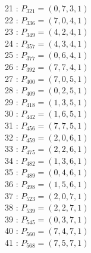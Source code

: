 \documentclass{article}
\begin{document}
{\begin{multicols}{2}
21 : $P_{321}=( 0, 7, 3, 1 )$\\
22 : $P_{336}=( 7, 0, 4, 1 )$\\
23 : $P_{349}=( 4, 2, 4, 1 )$\\
24 : $P_{357}=( 4, 3, 4, 1 )$\\
25 : $P_{377}=( 0, 6, 4, 1 )$\\
26 : $P_{392}=( 7, 7, 4, 1 )$\\
27 : $P_{400}=( 7, 0, 5, 1 )$\\
28 : $P_{409}=( 0, 2, 5, 1 )$\\
29 : $P_{418}=( 1, 3, 5, 1 )$\\
30 : $P_{442}=( 1, 6, 5, 1 )$\\
31 : $P_{456}=( 7, 7, 5, 1 )$\\
32 : $P_{459}=( 2, 0, 6, 1 )$\\
33 : $P_{475}=( 2, 2, 6, 1 )$\\
34 : $P_{482}=( 1, 3, 6, 1 )$\\
35 : $P_{489}=( 0, 4, 6, 1 )$\\
36 : $P_{498}=( 1, 5, 6, 1 )$\\
37 : $P_{523}=( 2, 0, 7, 1 )$\\
38 : $P_{539}=( 2, 2, 7, 1 )$\\
39 : $P_{545}=( 0, 3, 7, 1 )$\\
40 : $P_{560}=( 7, 4, 7, 1 )$\\
41 : $P_{568}=( 7, 5, 7, 1 )$\\
\end{multicols}
}
\end{document}
